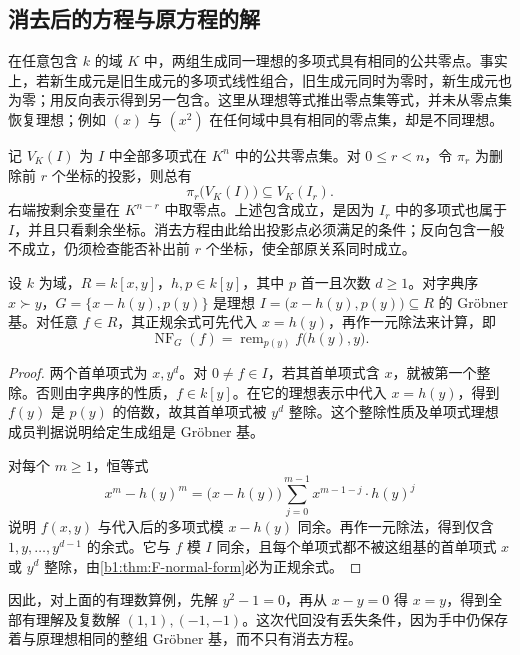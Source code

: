 \subsection{消去后的方程与原方程的解}
\label{b1:subsec:F04:02}

在任意包含 \(k\) 的域 \(K\) 中，两组生成同一理想的多项式具有相同的公共零点。事实上，若新生成元是旧生成元的多项式线性组合，旧生成元同时为零时，新生成元也为零；用反向表示得到另一包含。这里从理想等式推出零点集等式，并未从零点集恢复理想；例如 \((x)\) 与 \((x^2)\) 在任何域中具有相同的零点集，却是不同理想。

\ProseParagraphBreak
记 \(V_K(I)\) 为 \(I\) 中全部多项式在 \(K^n\) 中的公共零点集。对 \(0\le r<n\)，令 \(\pi_r\) 为删除前 \(r\) 个坐标的投影，则总有
\[
	\pi_r\bigl(V_K(I)\bigr)\subseteq V_K(I_r).
\]
右端按剩余变量在 \(K^{n-r}\) 中取零点。上述包含成立，是因为 \(I_r\) 中的多项式也属于 \(I\)，并且只看剩余坐标。消去方程由此给出投影点必须满足的条件；反向包含一般不成立，仍须检查能否补出前 \(r\) 个坐标，使全部原关系同时成立。

\begin{proposition}[三角生成组]\label{b1:prop:F-triangular-basis}
	设 \(k\) 为域，\(R=k[x,y]\)，\(h,p\in k[y]\)，其中 \(p\) 首一且次数 \(d\ge1\)。对字典序 \(x\succ y\)，\(G=\bigl\{x-h(y),p(y)\bigr\}\) 是理想 \(I=\bigl(x-h(y),p(y)\bigr)\subseteq R\) 的 Gröbner 基。对任意 \(f\in R\)，其正规余式可先代入 \(x=h(y)\)，再作一元除法来计算，即
	\[
		\operatorname{NF}_G(f) =\operatorname{rem}_{p(y)}f\bigl(h(y),y\bigr).
	\]
\end{proposition}
\begin{proof}
	两个首单项式为 \(x,y^d\)。对 \(0\ne f\in I\)，若其首单项式含 \(x\)，就被第一个整除。否则由字典序的性质，\(f\in k[y]\)。在它的理想表示中代入 \(x=h(y)\)，得到 \(f(y)\) 是 \(p(y)\) 的倍数，故其首单项式被 \(y^d\) 整除。这个整除性质及单项式理想成员判据说明给定生成组是 Gröbner 基。

	对每个 \(m\ge1\)，恒等式
	\[
		x^m-h(y)^m=\bigl(x-h(y)\bigr)\sum_{j=0}^{m-1}x^{m-1-j}\cdot h(y)^j
	\]
	说明 \(f(x,y)\) 与代入后的多项式模 \(x-h(y)\) 同余。再作一元除法，得到仅含 \(1,y,\ldots,y^{d-1}\) 的余式。它与 \(f\) 模 \(I\) 同余，且每个单项式都不被这组基的首单项式 \(x\) 或 \(y^d\) 整除，由\cref{b1:thm:F-normal-form}必为正规余式。
\end{proof}

因此，对上面的有理数算例，先解 \(y^2-1=0\)，再从 \(x-y=0\) 得 \(x=y\)，得到全部有理解及复数解 \((1,1),(-1,-1)\)。这次代回没有丢失条件，因为手中仍保存着与原理想相同的整组 Gröbner 基，而不只有消去方程。

